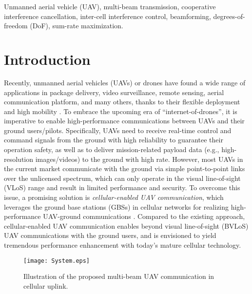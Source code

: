 \documentclass[onecolumn, draftclsnofoot, 12pt]{IEEEtran}
\begin{document}
\begin{IEEEkeywords}
Unmanned aerial vehicle (UAV), multi-beam transmission, cooperative interference cancellation, inter-cell interference control, beamforming, degrees-of-freedom (DoF), sum-rate maximization.
\end{IEEEkeywords}

\section{Introduction}\label{sec:Introduction}
Recently, unmanned aerial vehicles (UAVs) or drones have found a wide range of applications in package delivery, video surveillance, remote sensing, aerial communication platform, and many others, thanks to their flexible deployment and high mobility \cite{Zhang18}. To embrace the upcoming era of ``internet-of-drones'', it is imperative to enable high-performance communications between UAVs and their ground users/pilots. Specifically, UAVs need to receive real-time control and command signals from the ground with high reliability to guarantee their operation safety, as well as to deliver mission-related payload data (e.g., high-resolution images/videos) to the ground with high rate. However, most UAVs in the current market communicate with the ground via simple point-to-point links over the unlicensed spectrum, which can only operate in the visual line-of-sight (VLoS) range and result in limited performance and security. To overcome this issue, a promising solution is \emph{cellular-enabled UAV communication}, which leverages the ground base stations (GBSs) in cellular networks for realizing high-performance UAV-ground communications \cite{LTE,Lin17,CellularConnected}. Compared to the existing approach, cellular-enabled UAV communication enables beyond visual line-of-sight (BVLoS) UAV communications with the ground users, and is envisioned to yield tremendous performance enhancement with today's mature cellular technology.
\begin{figure}[t]
  \centering
  \texttt{[image: System.eps]}
  \caption{Illustration of the proposed multi-beam UAV communication in cellular uplink.}\label{system}
\end{figure}
\end{document}
